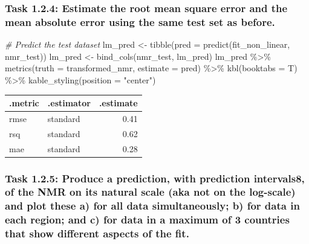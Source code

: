 \documentclass[
]{article}
\newenvironment{Shaded}{\begin{snugshade}}{\end{snugshade}}
\newcommand{\AttributeTok}[1]{\textcolor[rgb]{0.77,0.63,0.00}{#1}}
\newcommand{\CommentTok}[1]{\textcolor[rgb]{0.56,0.35,0.01}{\textit{#1}}}
\newcommand{\FunctionTok}[1]{\textcolor[rgb]{0.00,0.00,0.00}{#1}}
\newcommand{\NormalTok}[1]{#1}
\newcommand{\OtherTok}[1]{\textcolor[rgb]{0.56,0.35,0.01}{#1}}
\newcommand{\SpecialCharTok}[1]{\textcolor[rgb]{0.00,0.00,0.00}{#1}}
\newcommand{\StringTok}[1]{\textcolor[rgb]{0.31,0.60,0.02}{#1}}
\begin{document}
\hypertarget{task-1.2.4-estimate-the-root-mean-square-error-and-the-mean-absolute-error-using-the-same-test-set-as-before.}{%
\subsubsection{Task 1.2.4: Estimate the root mean square error and the
mean absolute error using the same test set as
before.}\label{task-1.2.4-estimate-the-root-mean-square-error-and-the-mean-absolute-error-using-the-same-test-set-as-before.}}

\begin{Shaded}
\begin{Highlighting}[]
\CommentTok{\# Predict the test dataset}
\NormalTok{lm\_pred }\OtherTok{\textless{}{-}} \FunctionTok{tibble}\NormalTok{(}\AttributeTok{pred =} \FunctionTok{predict}\NormalTok{(fit\_non\_linear, nmr\_test))}
\NormalTok{lm\_pred }\OtherTok{\textless{}{-}} \FunctionTok{bind\_cols}\NormalTok{(nmr\_test, lm\_pred)}
\NormalTok{lm\_pred }\SpecialCharTok{\%\textgreater{}\%} 
  \FunctionTok{metrics}\NormalTok{(}\AttributeTok{truth =}\NormalTok{ transformed\_nmr,}
          \AttributeTok{estimate =}\NormalTok{ pred) }\SpecialCharTok{\%\textgreater{}\%} 
  \FunctionTok{kbl}\NormalTok{(}\AttributeTok{booktabs =}\NormalTok{ T) }\SpecialCharTok{\%\textgreater{}\%}
  \FunctionTok{kable\_styling}\NormalTok{(}\AttributeTok{position =} \StringTok{"center"}\NormalTok{)}
\end{Highlighting}
\end{Shaded}

\begin{table}
\centering
\begin{tabular}[t]{llr}
\toprule
.metric & .estimator & .estimate\\
\midrule
rmse & standard & 0.41\\
rsq & standard & 0.62\\
mae & standard & 0.28\\
\bottomrule
\end{tabular}
\end{table}

\hypertarget{task-1.2.5-produce-a-prediction-with-prediction-intervals8-of-the-nmr-on-its-natural-scale-aka-not-on-the-log-scale-and-plot-these-a-for-all-data-simultaneously-b-for-data-in-each-region-and-c-for-data-in-a-maximum-of-3-countries-that-show-different-aspects-of-the-fit.}{%
\subsubsection{Task 1.2.5: Produce a prediction, with prediction
intervals8, of the NMR on its natural scale (aka not on the log-scale)
and plot these a) for all data simultaneously; b) for data in each
region; and c) for data in a maximum of 3 countries that show different
aspects of the
fit.}\label{task-1.2.5-produce-a-prediction-with-prediction-intervals8-of-the-nmr-on-its-natural-scale-aka-not-on-the-log-scale-and-plot-these-a-for-all-data-simultaneously-b-for-data-in-each-region-and-c-for-data-in-a-maximum-of-3-countries-that-show-different-aspects-of-the-fit.}}
\end{document}
